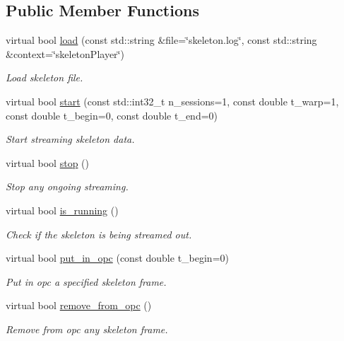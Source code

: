\subsection*{Public Member Functions}
\begin{DoxyCompactItemize}
\item 
virtual bool \hyperlink{classskeletonPlayer__IDL_ac34bafdeb8df497435c9c3da9d8dee5b}{load} (const std\+::string \&file=\char`\"{}skeleton.\+log\char`\"{}, const std\+::string \&context=\char`\"{}skeleton\+Player\char`\"{})
\begin{DoxyCompactList}\small\item\em Load skeleton file. \end{DoxyCompactList}\item 
virtual bool \hyperlink{classskeletonPlayer__IDL_a272d9b148696b9ed727c0e6d21894428}{start} (const std\+::int32\+\_\+t n\+\_\+sessions=1, const double t\+\_\+warp=1, const double t\+\_\+begin=0, const double t\+\_\+end=0)
\begin{DoxyCompactList}\small\item\em Start streaming skeleton data. \end{DoxyCompactList}\item 
virtual bool \hyperlink{classskeletonPlayer__IDL_a2214a63ff7aa12a79de5be488afc036a}{stop} ()
\begin{DoxyCompactList}\small\item\em Stop any ongoing streaming. \end{DoxyCompactList}\item 
virtual bool \hyperlink{classskeletonPlayer__IDL_abd0b1247e03f88d2169b0ed943ef91b7}{is\+\_\+running} ()
\begin{DoxyCompactList}\small\item\em Check if the skeleton is being streamed out. \end{DoxyCompactList}\item 
virtual bool \hyperlink{classskeletonPlayer__IDL_a9b02f3ee360ef27a1ec1b3f321fa5ed7}{put\+\_\+in\+\_\+opc} (const double t\+\_\+begin=0)
\begin{DoxyCompactList}\small\item\em Put in opc a specified skeleton frame. \end{DoxyCompactList}\item 
virtual bool \hyperlink{classskeletonPlayer__IDL_a5a8cedc7e51fc4129d1dadef1a7fec64}{remove\+\_\+from\+\_\+opc} ()
\begin{DoxyCompactList}\small\item\em Remove from opc any skeleton frame. \end{DoxyCompactList}\item 

\end{DoxyCompactItemize}
